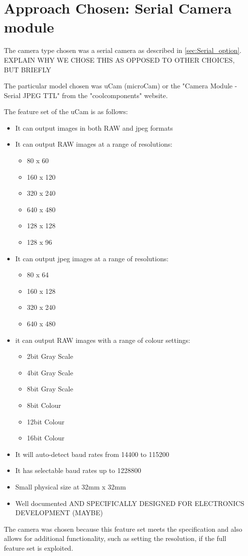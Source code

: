 \section{Approach Chosen: Serial Camera module}
\label{sec:John_chosen_options}

The camera type chosen was a serial camera as described in \ref{sec:Serial_option}. EXPLAIN WHY WE CHOSE THIS AS OPPOSED TO OTHER CHOICES, BUT BRIEFLY

The particular model chosen was uCam (microCam) or the "Camera Module - Serial JPEG TTL" from the "coolcomponents" website.

The feature set of the uCam is as follows:
	\begin{itemize}
		\item It can output images in both RAW and jpeg formats
		\item It can output RAW images at a range of resolutions:
		\begin{itemize}
			\item 80 x 60
			\item 160 x 120
			\item 320 x 240
			\item 640 x 480
			\item 128 x 128
			\item 128 x 96
		\end{itemize}
		\item It can output jpeg images at a range of resolutions:
		\begin{itemize}
			\item 80 x 64
			\item 160 x 128
			\item 320 x 240
			\item 640 x 480
		\end{itemize}
		\item it can output RAW images with a range of colour settings:
		\begin{itemize}
			\item 2bit Gray Scale
			\item 4bit Gray Scale
			\item 8bit Gray Scale
			\item 8bit Colour
			\item 12bit Colour
			\item 16bit Colour
		\end{itemize}
		\item It will auto-detect baud rates from 14400 to 115200
		\item It has selectable baud rates up to 1228800
		\item Small physical size at 32mm x 32mm
		\item Well documented AND SPECIFICALLY DESIGNED FOR ELECTRONICS DEVELOPMENT (MAYBE)
	\end{itemize}

The camera was chosen because this feature set meets the specification and also allows for additional functionality, such as setting the resolution, if the full feature set is exploited.